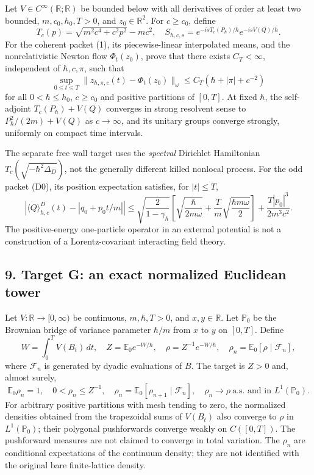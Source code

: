 \documentclass[11pt,a4paper]{article}
\begin{document}
Let \(V\in C^\infty(\mathbb R;\mathbb R)\) be bounded below with all
derivatives of order at least two bounded, \(m,c_0,h_0,T>0\), and
\(z_0\in\mathbb R^2\). For \(c\ge c_0\), define
\[T_c(p)=\sqrt{m^2c^4+c^2p^2}-mc^2,\quad
 S_{\hbar,c,s}=e^{-isT_c(P_\hbar)/\hbar}e^{-isV(Q)/\hbar}. \tag{F0}\]
For the coherent packet (1), its piecewise-linear interpolated means,
and the nonrelativistic Newton flow \(\Phi_t(z_0)\), prove that there
exists \(C_T<\infty\), independent of \(\hbar,c,\pi\), such that \[
 \sup_{0\le t\le T}
 \|z_{\hbar,\pi,c}(t)-\Phi_t(z_0)\|_\omega
 \le C_T(\hbar+|\pi|+c^{-2}) \tag{F1}
\] for all \(0<\hbar\le h_0\), \(c\ge c_0\) and positive partitions of
\([0,T]\). At fixed \(\hbar\), the self-adjoint \(T_c(P_\hbar)+V(Q)\)
converges in strong resolvent sense to \(P_\hbar^2/(2m)+V(Q)\) as
\(c\to\infty\), and its unitary groups converge strongly, uniformly on
compact time intervals.

The separate free wall target uses the \emph{spectral} Dirichlet
Hamiltonian \(T_c(\sqrt{-\hbar^2\Delta_D})\), not the generally
different killed nonlocal process. For the odd packet (D0), its position
expectation satisfies, for \(|t|\le T\), \[
 \left|\langle Q\rangle^D_{\hbar,c}(t)-
           |q_0+p_0t/m|\right|
 \le\sqrt{\frac2{1-\gamma_\hbar}}
  \left[\sqrt{\frac{\hbar}{2m\omega}}+
        \frac Tm\sqrt{\frac{\hbar m\omega}{2}}\right]
       +\frac{T|p_0|^3}{2m^3c^2}. \tag{F2}
\] The positive-energy one-particle operator in an external potential is
not a construction of a Lorentz-covariant interacting field theory.

\hypertarget{target-g-an-exact-normalized-euclidean-tower}{%
\subsection{9. Target G: an exact normalized Euclidean
tower}\label{target-g-an-exact-normalized-euclidean-tower}}

Let \(V:\mathbb R\to[0,\infty)\) be continuous, \(m,\hbar,T>0\), and
\(x,y\in\mathbb R\). Let \(\mathbb P_0\) be the Brownian bridge of
variance parameter \(\hbar/m\) from \(x\) to \(y\) on \([0,T]\). Define
\[
 W=\int_0^TV(B_t)\,dt,\quad
 Z=\mathbb E_0e^{-W/\hbar},\quad
 \rho=Z^{-1}e^{-W/\hbar},\quad
 \rho_n=\mathbb E_0[\rho\mid\mathcal F_n], \tag{G0}
\] where \(\mathcal F_n\) is generated by dyadic evaluations of \(B\).
The target is \(Z>0\) and, almost surely, \[
 \mathbb E_0\rho_n=1,\quad 0<\rho_n\le Z^{-1},\quad
 \rho_n=\mathbb E_0[\rho_{n+1}\mid\mathcal F_n],\quad
 \rho_n\to\rho\ \text{a.s. and in }L^1(\mathbb P_0). \tag{G1}
\] For arbitrary positive partitions with mesh tending to zero, the
normalized densities obtained from the trapezoidal sums of \(V(B_t)\)
also converge to \(\rho\) in \(L^1(\mathbb P_0)\); their polygonal
pushforwards converge weakly on \(C([0,T])\). The pushforward measures
are not claimed to converge in total variation. The \(\rho_n\) are
conditional expectations of the continuum density; they are not
identified with the original bare finite-lattice density.
\end{document}
